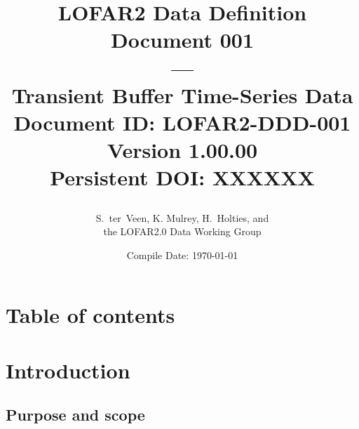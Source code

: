 \documentclass[a4paper,10pt,bibtotoc]{scrartcl}
\begin{document}
\title{LOFAR2 Data Definition Document 001 \\ --- \\ Transient Buffer Time-Series Data \\
  {\normalsize Document ID: LOFAR2-DDD-001} \\
  {\normalsize Version 1.00.00} \\
   {\normalsize Persistent DOI: XXXXXX} \\
\author{ \parbox{\linewidth}{\centering S.~ter~Veen,  K. Mulrey, H.~Holties, and \\the LOFAR2.0 Data Working Group} }
\date{\small{Compile Date: \today}} 
}

\maketitle

\section{Table of contents}
\tableofcontents

\listoffigures

\listoftables

\clearpage










\clearpage


\section{Introduction}
\label{sec:introduction}

\subsection{Purpose and scope}
\label{sec:purpose and scope}
\end{document}
